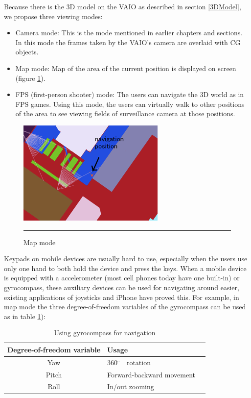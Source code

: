 Because there is the 3D model on the VAIO as described in section \ref{3DModel}, we propose three viewing modes:

\begin{itemize}
	\item Camera mode: This is the mode mentioned in earlier chapters and sections. In this mode the frames taken by the VAIO's camera are overlaid with CG objects.
	\item Map mode: Map of the area of the current position is displayed on screen (figure \ref{fig:MapMode}).
	\item FPS (first-person shooter) mode: The users can navigate the 3D world as in FPS games. Using this mode, the users can virtually walk to other positions of the area to see viewing fields of surveillance camera at those positions.
\end{itemize}

\begin{figure}[htbp]
	\centering
	\includegraphics{./Primitives/map_mode.png}
	\rule{35em}{0.5pt}
	\caption[Map mode]{Map mode}
	\label{fig:MapMode}
\end{figure}

Keypads on mobile devices are usually hard to use, especially when the users use only one hand to both hold the device and press the keys. When a mobile device is equipped with a accelerometer (most cell phones today have one built-in) or gyrocompass, these auxiliary devices can be used for navigating around easier, existing applications of joysticks and iPhone have proved this. For example, in map mode the three degree-of-freedom variables of the gyrocompass can be used as in table \ref{tb:GyrocompassNavigation}):

\begin{table}[tb]
	\begin{center}
		\caption{Using gyrocompass for navigation}
		\label{tb:GyrocompassNavigation}
		\begin{tabular}{|c|l|l|}
			\hline
			Degree-of-freedom variable & Usage                     \\
			\hline
			Yaw                        & 360$^\circ$　rotation      \\
			Pitch                      & Forward-backward movement \\
			Roll                       & In/out zooming            \\
			\hline
		\end{tabular}
	\end{center}
\end{table}

